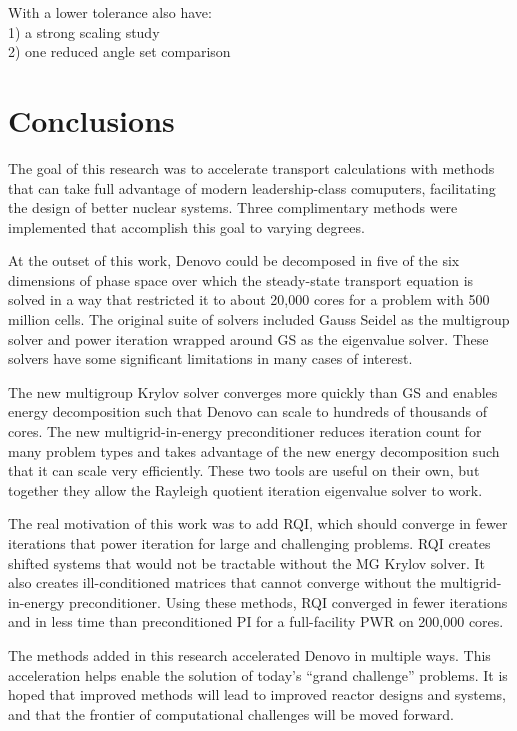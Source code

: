\documentclass[preprint,12pt]{elsarticle}
\begin{document}
With a lower tolerance also have: \\
1) a strong scaling study \\
2) one reduced angle set comparison


\section{Conclusions}
\label{sec:conclusions}
The goal of this research was to accelerate transport calculations with methods that can take full advantage of modern leadership-class comuputers, facilitating the design of better nuclear systems. Three complimentary methods were implemented that accomplish this goal to varying degrees. 

At the outset of this work, Denovo could be decomposed in five of the six dimensions of phase space over which the steady-state transport equation is solved in a way that restricted it to about 20,000 cores for a problem with 500 million cells. The original suite of solvers included Gauss Seidel as the multigroup solver and power iteration wrapped around GS as the eigenvalue solver. These solvers have some significant limitations in many cases of interest. 

The new multigroup Krylov solver converges more quickly than GS and enables energy decomposition such that Denovo can scale to hundreds of thousands of cores. The new multigrid-in-energy preconditioner reduces iteration count for many problem types and takes advantage of the new energy decomposition such that it can scale very efficiently. These two tools are useful on their own, but together they allow the Rayleigh quotient iteration eigenvalue solver to work.

The real motivation of this work was to add RQI, which should converge in fewer iterations that power iteration for large and challenging problems. RQI creates shifted systems that would not be tractable without the MG Krylov solver. It also creates ill-conditioned matrices that cannot converge without the multigrid-in-energy preconditioner. Using these methods, RQI converged in fewer iterations and in less time than preconditioned PI for a full-facility PWR on 200,000 cores. 

The methods added in this research accelerated Denovo in multiple ways. This acceleration helps enable the solution of today’s “grand challenge” problems. It is hoped that improved methods will lead to improved reactor designs and systems, and that the frontier of computational challenges will be moved forward.
\end{document}
